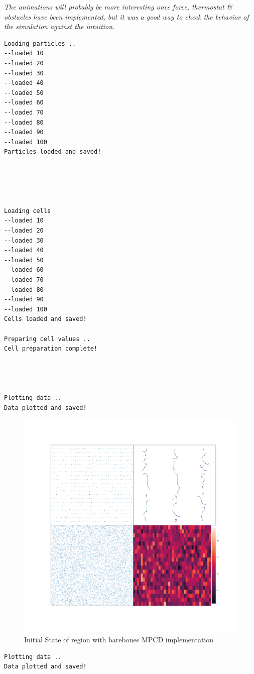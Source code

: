 \documentclass[
]{article}
\begin{document}
\emph{The animations will probably be more interesting once force,
thermostat \& obstacles have been implemented, but it was a good way to
check the behavior of the simulation against the intuition.}

\begin{verbatim}
Loading particles ..
--loaded 10
--loaded 20
--loaded 30
--loaded 40
--loaded 50
--loaded 60
--loaded 70
--loaded 80
--loaded 90
--loaded 100
Particles loaded and saved!





Loading cells
--loaded 10
--loaded 20
--loaded 30
--loaded 40
--loaded 50
--loaded 60
--loaded 70
--loaded 80
--loaded 90
--loaded 100
Cells loaded and saved!

Preparing cell values ..
Cell preparation complete!




Plotting data ..
Data plotted and saved!
\end{verbatim}

\begin{figure}
\centering
\includegraphics{Assets/initial_region.png}
\caption{Initial State of region with barebones MPCD implementation}
\end{figure}

\begin{verbatim}
Plotting data ..
Data plotted and saved!
\end{verbatim}
\end{document}
